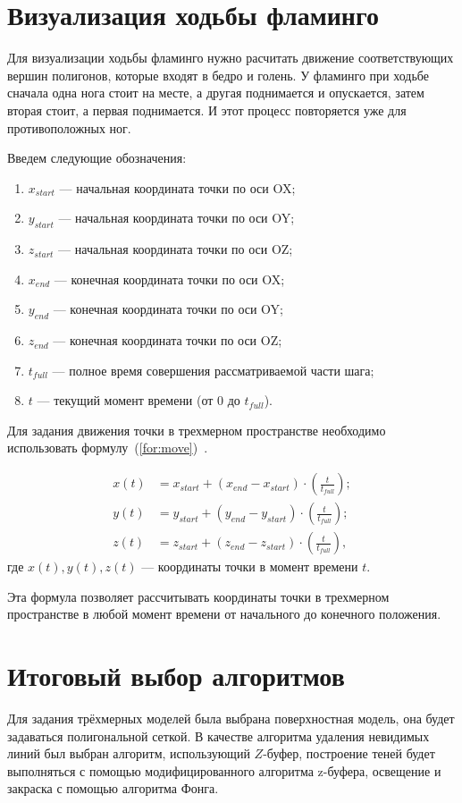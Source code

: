 \section{Визуализация ходьбы фламинго}

Для визуализации ходьбы фламинго нужно расчитать движение соответствующих вершин полигонов, которые входят в бедро и голень. 
У фламинго при ходьбе сначала одна нога стоит на месте, а другая поднимается и опускается, затем вторая стоит, а первая поднимается.
И этот процесс повторяется уже для противоположных ног. 

Введем следующие обозначения:
\begin{enumerate}[label=\arabic*)]
	\item $x_{start}$ --- начальная координата точки по оси OX;
	\item $y_{start}$ --- начальная координата точки по оси OY;
	\item $z_{start}$ --- начальная координата точки по оси OZ;
	\item $x_{end}$ --- конечная координата точки по оси OX;
	\item $y_{end}$ --- конечная координата точки по оси OY;
	\item $z_{end}$ --- конечная координата точки по оси OZ;
	\item $t_{full}$ --- полное время совершения рассматриваемой части шага;
	\item $t$ --- текущий момент времени (от 0 до $t_{full}$).
\end{enumerate}


Для задания движения точки в трехмерном пространстве необходимо использовать формулу~(\ref{for:move})~\cite{angem}.

\begin{equation} 
	\label{for:move}
\begin{align*}
	x(t) &= x_{start} + (x_{end} - x_{start}) \cdot \left(\frac{t}{{t_{full}}}\right); \\
	y(t) &= y_{start} + (y_{end} - y_{start}) \cdot \left(\frac{t}{{t_{full}}}\right); \\
	z(t) &= z_{start} + (z_{end} - z_{start}) \cdot \left(\frac{t}{{t_{full}}}\right),
\end{align*}
\end{equation}
где $x(t), y(t), z(t)$ --- координаты точки в момент времени $t$.


Эта формула позволяет рассчитывать координаты точки в трехмерном пространстве в любой момент времени от начального до конечного положения.

\section{Итоговый выбор алгоритмов} 

Для задания трёхмерных моделей была выбрана поверхностная модель, она будет задаваться полигональной сеткой. В качестве алгоритма удаления невидимых линий был выбран алгоритм, использующий $Z$-буфер, построение теней будет выполняться с помощью модифицированного алгоритма z-буфера, освещение и закраска с помощью алгоритма Фонга.

